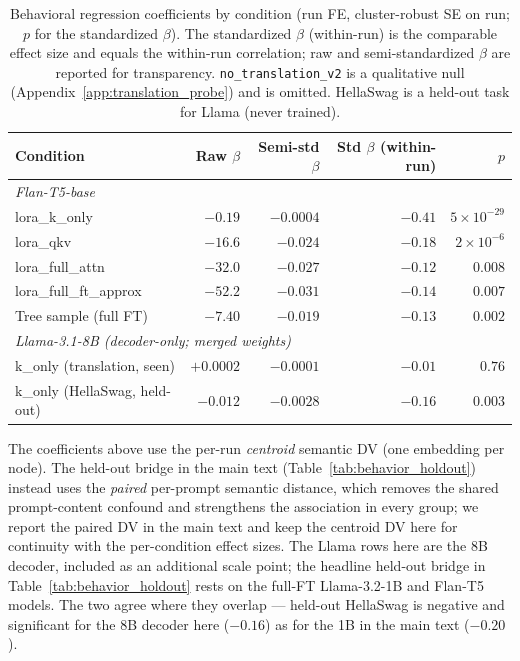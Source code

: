 \documentclass{article}
\theoremstyle{definition}
\theoremstyle{plain}
\begin{document}
\begin{table}[h]
\caption{Behavioral regression coefficients by condition (run FE, cluster-robust SE on run; $p$ for
  the standardized $\beta$). The standardized $\beta$ (within-run) is the comparable effect size and
  equals the within-run correlation; raw and semi-standardized $\beta$ are reported for transparency.
  \texttt{no\_translation\_v2} is a qualitative null (Appendix~\ref{app:translation_probe}) and is
  omitted. HellaSwag is a held-out task for Llama (never trained).}
\label{tab:regression_betas}
\begin{center}
\begin{tabular}{lrrrr}
\toprule
Condition & Raw $\beta$ & Semi-std $\beta$ & Std $\beta$ (within-run) & $p$ \\
\midrule
\multicolumn{5}{l}{\textit{Flan-T5-base}} \\
lora\_k\_only          & $-0.19$  & $-0.0004$ & $-0.41$ & $5\!\times\!10^{-29}$ \\
lora\_qkv              & $-16.6$  & $-0.024$  & $-0.18$ & $2\!\times\!10^{-6}$ \\
lora\_full\_attn       & $-32.0$  & $-0.027$  & $-0.12$ & $0.008$ \\
lora\_full\_ft\_approx & $-52.2$  & $-0.031$  & $-0.14$ & $0.007$ \\
Tree sample (full FT)  & $-7.40$  & $-0.019$  & $-0.13$ & $0.002$ \\
\midrule
\multicolumn{5}{l}{\textit{Llama-3.1-8B (decoder-only; merged weights)}} \\
k\_only (translation, seen)   & $+0.0002$ & $-0.0001$ & $-0.01$ & $0.76$ \\
k\_only (HellaSwag, held-out) & $-0.012$  & $-0.0028$ & $-0.16$ & $0.003$ \\
\bottomrule
\end{tabular}
\end{center}
\end{table}

The coefficients above use the per-run \emph{centroid} semantic DV (one embedding per node). The
held-out bridge in the main text (Table~\ref{tab:behavior_holdout}) instead uses the \emph{paired}
per-prompt semantic distance, which removes the shared prompt-content confound and strengthens the
association in every group; we report the paired DV in the main text and keep the centroid DV here for
continuity with the per-condition effect sizes. The Llama rows here are the 8B decoder, included as an
additional scale point; the headline held-out bridge in Table~\ref{tab:behavior_holdout} rests on the
full-FT Llama-3.2-1B and Flan-T5 models. The two agree where they overlap --- held-out HellaSwag is
negative and significant for the 8B decoder here ($-0.16$) as for the 1B in the main text ($-0.20$).
\end{document}
